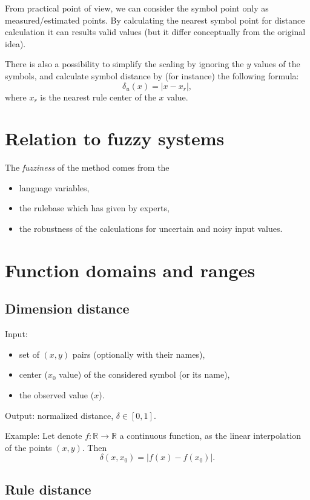 \documentclass[a4paper,12pt]{article}
\begin{document}
From practical point of view, we can consider the symbol point only as measured/estimated points. By calculating the nearest symbol point for distance calculation it can results valid values (but it differ conceptually from the original idea).

There is also a possibility to simplify the scaling by ignoring the $y$ values of the symbols, and calculate symbol distance by (for instance) the following formula:
\[
\delta_u(x) = |x - x_r|,
\]
where $x_r$ is the nearest rule center of the $x$ value.

\section{Relation to fuzzy systems}

The \textit{fuzziness} of the method comes from the
\begin{itemize}
    \item language variables,
    \item the rulebase which has given by experts,
    \item the robustness of the calculations for uncertain and noisy input values.
\end{itemize}

\section{Function domains and ranges}

\subsection{Dimension distance}

Input:
\begin{itemize}
	\item set of $(x, y)$ pairs (optionally with their names),
	\item center ($x_0$ value) of the considered symbol (or its name),
	\item the observed value ($x$).
\end{itemize}
Output: normalized distance, $\delta \in [0, 1]$.

\medskip

\noindent Example: Let denote $f: \mathbb{R} \rightarrow \mathbb{R}$ a continuous function, as the linear interpolation of the points $(x, y)$. Then
\[
\delta(x, x_0) = \left| f(x) - f(x_0) \right|.
\]

\subsection{Rule distance}
\end{document}

